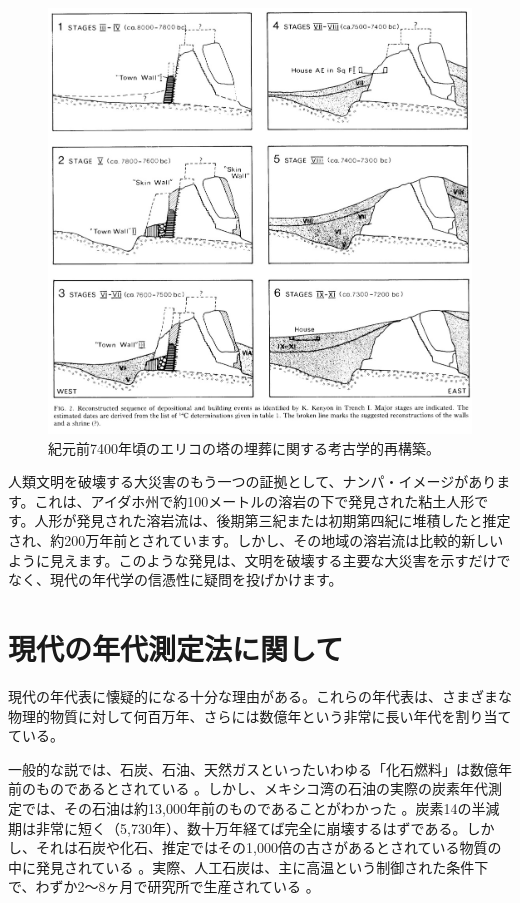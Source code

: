 \documentclass[10pt,twocolumn,letterpaper]{article}
\begin{document}
\begin{figure}[b]
\begin{center}
   \includegraphics[width=1\linewidth]{jericho.jpg}
\end{center}
   \caption{紀元前7400年頃のエリコの塔の埋葬に関する考古学的再構築\cite{95}。}
\label{fig:14}
\label{fig:onecol}
\end{figure}

人類文明を破壊する大災害のもう一つの証拠として、ナンパ・イメージがあります。これは、アイダホ州で約100メートルの溶岩の下で発見された粘土人形です\cite{102,103}。人形が発見された溶岩流は、後期第三紀または初期第四紀に堆積したと推定され、約200万年前とされています。しかし、その地域の溶岩流は比較的新しいように見えます。このような発見は、文明を破壊する主要な大災害を示すだけでなく、現代の年代学の信憑性に疑問を投げかけます。

\section{現代の年代測定法に関して}

現代の年代表に懐疑的になる十分な理由がある。これらの年代表は、さまざまな物理的物質に対して何百万年、さらには数億年という非常に長い年代を割り当てている。

一般的な説では、石炭、石油、天然ガスといったいわゆる「化石燃料」は数億年前のものであるとされている \cite{104}。しかし、メキシコ湾の石油の実際の炭素年代測定では、その石油は約13,000年前のものであることがわかった \cite{105}。炭素14の半減期は非常に短く（5,730年）、数十万年経てば完全に崩壊するはずである。しかし、それは石炭や化石、推定ではその1,000倍の古さがあるとされている物質の中に発見されている \cite{106}。実際、人工石炭は、主に高温という制御された条件下で、わずか2〜8ヶ月で研究所で生産されている \cite{107}。
\end{document}
